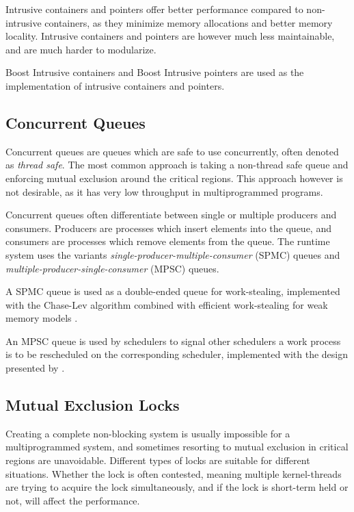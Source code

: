 Intrusive containers and pointers offer better performance compared to non\hyp{}intrusive containers, as they minimize memory allocations and better memory locality. Intrusive containers and pointers are however much less maintainable, and are much harder to modularize.

Boost Intrusive containers and Boost Intrusive pointers are used as the implementation of intrusive containers and pointers.


\subsection{Concurrent Queues}


Concurrent queues are queues which are safe to use concurrently, often denoted as \textit{thread safe}. The most common approach is taking a non\hyp{}thread safe queue and enforcing mutual exclusion around the critical regions. This approach however is not desirable, as it has very low throughput in multiprogrammed programs.

Concurrent queues often differentiate between single or multiple producers and consumers. Producers are processes which insert elements into the queue, and consumers are processes which remove elements from the queue. The runtime system uses the variants \textit{single\hyp{}producer\hyp{}multiple\hyp{}consumer} (SPMC) queues and \textit{multiple\hyp{}producer\hyp{}single\hyp{}consumer} (MPSC) queues.

A SPMC queue is used as a double\hyp{}ended queue for work\hyp{}stealing, implemented with the Chase\hyp{}Lev algorithm \citep{chase2005dynamic} combined with efficient work\hyp{}stealing for weak memory models \citep{le2013correct}.

An MPSC queue is used by schedulers to signal other schedulers a work process is to be rescheduled on the corresponding scheduler, implemented with the design presented by \citet{vyukov2014intrusive}. 


\subsection{Mutual Exclusion Locks}


Creating a complete non\hyp{}blocking system is usually impossible for a multiprogrammed system, and sometimes resorting to mutual exclusion in critical regions are unavoidable. Different types of locks are suitable for different situations. Whether the lock is often contested, meaning multiple kernel\hyp{}threads are trying to acquire the lock simultaneously, and if the lock is short\hyp{}term held or not, will affect the performance. 

